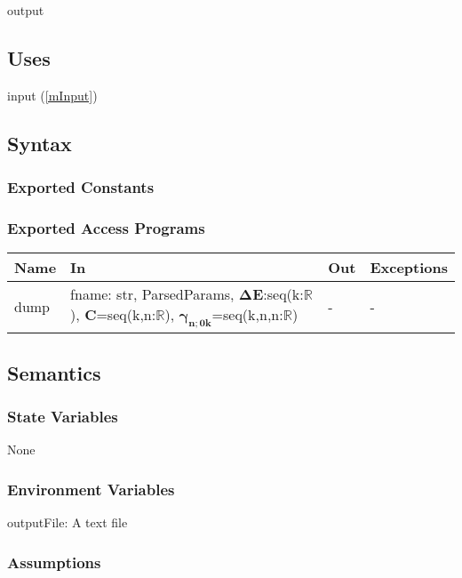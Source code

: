 \documentclass[12pt, titlepage]{article}
\begin{document}
output

\subsection{Uses}
input (\ref{mInput})

\subsection{Syntax}

\subsubsection{Exported Constants}

\subsubsection{Exported Access Programs}

\begin{center}
	\begin{tabular}{p{2cm} p{4cm} p{4cm} p{2cm}}
		\hline
		\textbf{Name} & \textbf{In} & \textbf{Out} & \textbf{Exceptions} \\
		\hline
		dump & fname: str, ParsedParams, $\boldsymbol{\Delta 
		E}$:seq(k:$\mathbb{R}$), 
		$\boldsymbol{C}$=seq(k,n:$\mathbb{R}$), 
		$\boldsymbol{\gamma_{n;0k}}$=seq(k,n,n:$\mathbb{R}$)& - & - \\
		\hline
	\end{tabular}
\end{center}

\subsection{Semantics}

\subsubsection{State Variables}
None

\subsubsection{Environment Variables}
outputFile: A text file

\subsubsection{Assumptions}
\end{document}

